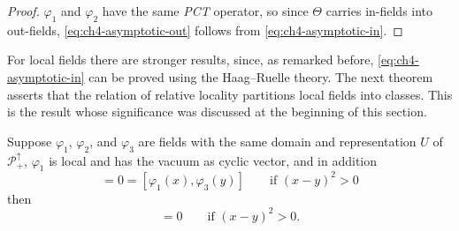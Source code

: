 \begin{proof}
$\varphi_1$ and $\varphi_2$ have the same \emph{PCT} operator, so since
$\Theta$ carries in-fields into out-fields, \eqref{eq:ch4-asymptotic-out} follows from \eqref{eq:ch4-asymptotic-in}.
\end{proof}

For local fields there are stronger results, since, as remarked before,
\eqref{eq:ch4-asymptotic-in} can be proved using the Haag--Ruelle theory. The next theorem asserts
that the relation of relative locality partitions local fields into classes.
This is the result whose significance was discussed at the beginning of this
section.

\begin{theorem}[4-21]\label{thm:ch4-21-relative-locality-transitive}
Suppose $\varphi_1$, $\varphi_2$, and $\varphi_3$ are fields with the same
domain and representation $U$ of $\mathcal P_+^\uparrow$, $\varphi_1$ is
local and has the vacuum as cyclic vector, and in addition
\begin{equation*}
  [\varphi_1(x),\varphi_2(y)]=0=[\varphi_1(x),\varphi_3(y)]
  \qquad \text{if }(x-y)^2>0
\end{equation*}
then
\begin{equation*}
  [\varphi_2(x),\varphi_3(y)]=0
  \qquad \text{if }(x-y)^2>0.
\end{equation*}
\end{theorem}

